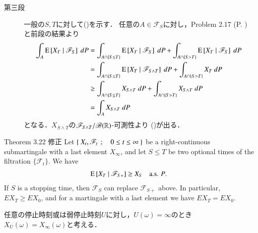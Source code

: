 \begin{prf}
\begin{description}
			\item[第三段]
				一般の$S,T$に対して()を示す．
				任意の$A \in \mathscr{F}_S$に対し，Problem 2.17 (P. \pageref{chapter_1_Problem_2_17})
				と前段の結果より
				\begin{align}
					\int_A \cexp{X_T}{\mathscr{F}_S}\ dP
					&= \int_{A \cap \{S \leq T\}} \cexp{X_T}{\mathscr{F}_S}\ dP
						+ \int_{A \cap \{S > T\}} \cexp{X_T}{\mathscr{F}_S}\ dP \\
					&= \int_{A \cap \{S \leq T\}} \cexp{X_T}{\mathscr{F}_{S \wedge T}}\ dP
						+ \int_{A \cap \{S > T\}} X_T\ dP \\
					&\geq \int_{A \cap \{S \leq T\}} X_{S \wedge T}\ dP
					 	+ \int_{A \cap \{S > T\}} X_{S \wedge T}\ dP \\
					&= \int_A X_{S \wedge T}\ dP
				\end{align}
				となる．$X_{S \wedge T}$の$\mathscr{F}_{S \wedge T}/\mathscr{B}(\mathbb{R})$-可測性より
				()が出る．
				\QED
		\end{description}
	\end{prf}
	
	\begin{itembox}[l]{Theorem 3.22 修正}
		Let $\left\{\ X_t,\mathscr{F}_t\ \, ; \quad 0 \leq t \leq \infty\ \right\}$ be a right-continuous submartingale with a last element $X_\infty$,
		and let $S \leq T$ be two optional times of the filtration $\{\mathscr{F}_t\}$. We have
		\begin{align}
			\operatorname{E} \left[ X_T \ \middle|\ \mathscr{F}_{S+} \right] \geq X_S
			\quad \mbox{a.s. $P$}.
		\end{align}
		If $S$ is a stopping time, then $\mathscr{F}_S$ can replace $\mathscr{F}_{S+}$ above.
		In particular, $EX_T \geq EX_0$, and for a martingale with a last element we have $EX_T = EX_0$.
	\end{itembox}
	
	任意の停止時刻或は弱停止時刻$U$に対し，$U(\omega) = \infty$のとき$X_U(\omega) = X_\infty(\omega)$と考える．
	
